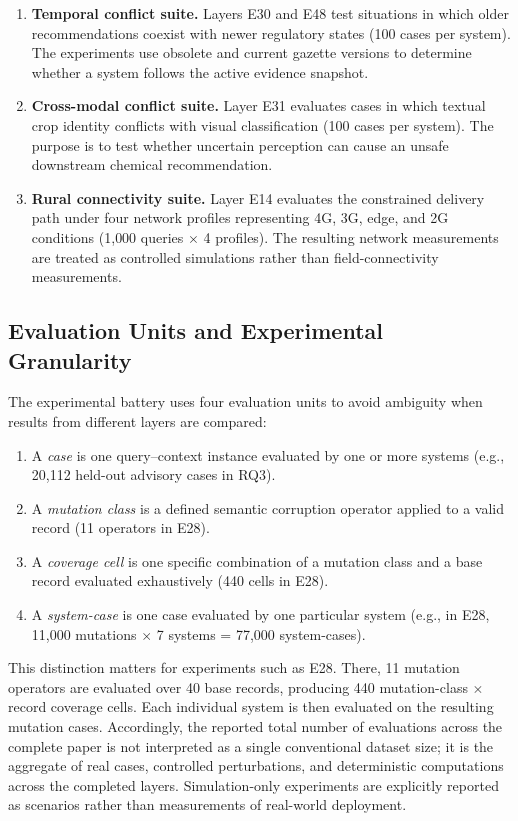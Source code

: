 \documentclass[a4paper,fleqn]{cas-dc}
\begin{document}
\begin{enumerate}
    \item \textbf{Temporal conflict suite.} Layers E30 and E48 test situations in which older recommendations coexist with newer regulatory states (100 cases per system). The experiments use obsolete and current gazette versions to determine whether a system follows the active evidence snapshot.
    \item \textbf{Cross-modal conflict suite.} Layer E31 evaluates cases in which textual crop identity conflicts with visual classification (100 cases per system). The purpose is to test whether uncertain perception can cause an unsafe downstream chemical recommendation.
    \item \textbf{Rural connectivity suite.} Layer E14 evaluates the constrained delivery path under four network profiles representing 4G, 3G, edge, and 2G conditions (1{,}000 queries $\times$ 4 profiles). The resulting network measurements are treated as controlled simulations rather than field-connectivity measurements.
\end{enumerate}

\subsection{Evaluation Units and Experimental Granularity}

The experimental battery uses four evaluation units to avoid ambiguity when results from different layers are compared:
\begin{enumerate}
    \item A \textit{case} is one query--context instance evaluated by one or more systems (e.g., 20{,}112 held-out advisory cases in RQ3).
    \item A \textit{mutation class} is a defined semantic corruption operator applied to a valid record (11 operators in E28).
    \item A \textit{coverage cell} is one specific combination of a mutation class and a base record evaluated exhaustively (440 cells in E28).
    \item A \textit{system-case} is one case evaluated by one particular system (e.g., in E28, 11{,}000 mutations $\times$ 7 systems = 77{,}000 system-cases).
\end{enumerate}

This distinction matters for experiments such as E28. There, 11 mutation operators are evaluated over 40 base records, producing 440 mutation-class $\times$ record coverage cells. Each individual system is then evaluated on the resulting mutation cases. Accordingly, the reported total number of evaluations across the complete paper is not interpreted as a single conventional dataset size; it is the aggregate of real cases, controlled perturbations, and deterministic computations across the completed layers. Simulation-only experiments are explicitly reported as scenarios rather than measurements of real-world deployment.
\end{document}
